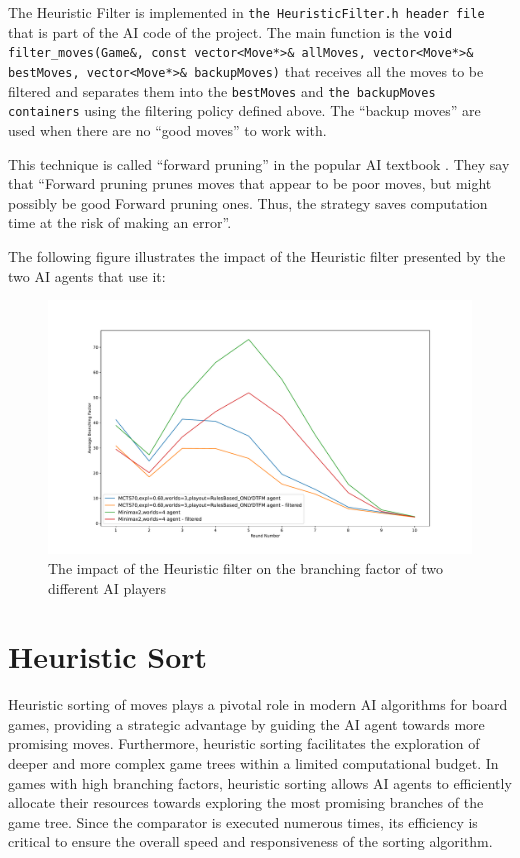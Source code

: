 The Heuristic Filter is implemented in \texttt{the HeuristicFilter.h header file} that is part of the AI code of the project. The main function is the 
\texttt{void filter\_moves(Game\&, const vector<Move*>\& allMoves, vector<Move*>\& bestMoves, vector<Move*>\& backupMoves)} that receives all the moves to be filtered
and separates them into the \texttt{bestMoves} and \texttt{the backupMoves containers} using the filtering policy defined above.
The ``backup moves'' are used when there are no ``good moves'' to work with.

This technique is called ``forward pruning'' in the popular AI textbook \cite{norvig2002modern} . They say that ``Forward pruning prunes moves that appear to be poor moves, 
but might possibly be good Forward pruning ones. Thus, the strategy saves computation time at the risk of making an error''.

The following figure illustrates the impact of the Heuristic filter presented by the two AI agents that use it:
\begin{figure}[H]
    \caption{The impact of the Heuristic filter on the branching factor of two different AI players}
    \centerline{\mbox{\includegraphics[width=180mm]{img/heuristic_filter.pdf}}}
    \label{fig:example}
\end{figure}

\section{Heuristic Sort} \label{sec:Heuristic_sort}

Heuristic sorting of moves plays a pivotal role in modern AI algorithms for board games, providing a strategic advantage by guiding the AI agent towards more promising moves. 
Furthermore, heuristic sorting facilitates the exploration of deeper and more complex game trees within a limited computational budget. In games with high branching factors, 
heuristic sorting allows AI agents to efficiently allocate their resources towards exploring the most promising branches of the game tree. Since the comparator is executed numerous times, 
its efficiency is critical to ensure the overall speed and responsiveness of the sorting algorithm.

